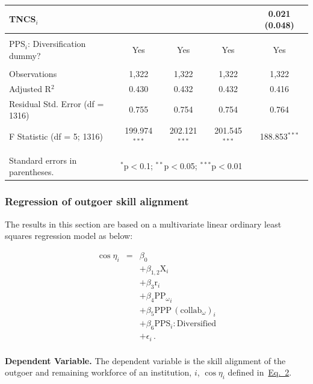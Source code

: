 \documentclass[draft,final]{vutinfth} %
\begin{document}
\begin{table}[!htbp]
\begin{tabularx}{\textwidth}{@{\extracolsep{\fill}}lcccc}
  TNCS$_{i}$ &  &  &  & 0.021 (0.048) \\ 
 \hline \\[-1.8ex] 
PPS$_{i}$: Diversification dummy?  & Yes & Yes & Yes & Yes \\ 
\hline \\[-1.8ex] 
Observations & 1,322 & 1,322 & 1,322 & 1,322 \\ 
Adjusted R$^{2}$ & 0.430 & 0.432 & 0.432 & 0.416 \\ 
Residual Std. Error (df = 1316) & 0.755 & 0.754 & 0.754 & 0.764 \\ 
F Statistic (df = 5; 1316) & 199.974$^{***}$ & 202.121$^{***}$ & 201.545$^{***}$ & 188.853$^{***}$ \\ 
\hline 
\hline \\[-1.8ex] 
Standard errors in parentheses. & \multicolumn{4}{l}{$^{*}$p$<$0.1; $^{**}$p$<$0.05; $^{***}$p$<$0.01} \\ 
\end{tabularx} 
\end{table} 

\subsubsection{Regression of outgoer skill alignment ~\label{SI4.2}}
The results in this section are based on a multivariate linear ordinary least squares regression model as below:

\begin{equation} \label{equation 9}
\begin{array}{lcl}
{\cos \eta}_{i} &=& \beta_0\\
&& + \beta_{1,2} {\mathrm{X}}_{i}\\
&& + \beta_{3} {\mathrm{r}}_{i}\\
&& + \beta_{4} {\mathrm{PP}_{\omega}}_{i}\\
&& + \beta_{5} {\mathrm{PPP}\,(\mathrm{collab}_{\omega})_{i}}\\
&& + \beta_{6} {\mathrm{PPS}_{i}: \mathrm{Diversified}}\\
&& + \epsilon_i \, .\\
\end{array}
\end{equation} 

\textbf{Dependent Variable.} The dependent variable is the skill alignment of the outgoer and remaining workforce of an institution, $i$, $\cos{\eta}_i$ defined in~\hyperref[Definition of skills section]{Eq.~2}. 
\end{document}
